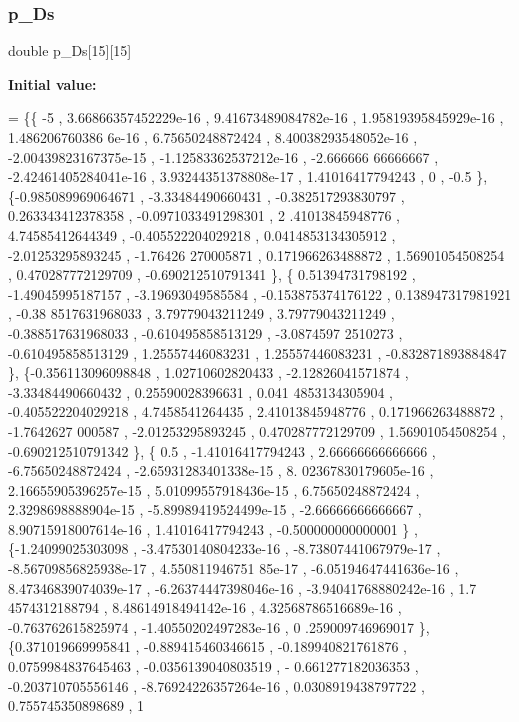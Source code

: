 \subsubsection{\texorpdfstring{p\+\_\+\+Ds}{p\_Ds}}
{\footnotesize\ttfamily double p\+\_\+\+Ds\mbox{[}15\mbox{]}\mbox{[}15\mbox{]}}

{\bfseries Initial value\+:}
\begin{DoxyCode}
= \{\{               -5 , 3.66866357452229e-16 , 9.41673489084782e-16 , 1.95819395845929e-16 , 1.486206760386
      6e-16 ,  6.75650248872424 , 8.40038293548052e-16 , -2.00439823167375e-15 , -1.12583362537212e-16 , -2.666666
      66666667 , -2.42461405284041e-16 , 3.93244351378808e-17 ,  1.41016417794243 ,                 0 ,           
         -0.5 \},
\{-0.985089969064671 , -3.33484490660431 , -0.382517293830797 , 0.263343412378358 , -0.0971033491298301 ,  2
      .41013845948776 ,  4.74585412644349 , -0.405522204029218 , 0.0414853134305912 , -2.01253295893245 , -1.76426
      270005871 , 0.171966263488872 ,  1.56901054508254 , 0.470287772129709 , -0.690212510791341 \},
\{ 0.51394731798192 , -1.49045995187157 , -3.19693049585584 , -0.153875374176122 , 0.138947317981921 , -0.38
      8517631968033 ,  3.79779043211249 ,  3.79779043211249 , -0.388517631968033 , -0.610495858513129 , -3.0874597
      2510273 , -0.610495858513129 ,  1.25557446083231 ,  1.25557446083231 , -0.832871893884847 \},
\{-0.356113096098848 ,  1.02710602820433 , -2.12826041571874 , -3.33484490660432 ,  0.25590028396631 , 0.041
      4853134305904 , -0.405522204029218 ,   4.7458541264435 ,  2.41013845948776 , 0.171966263488872 ,  -1.7642627
      000587 , -2.01253295893245 , 0.470287772129709 ,  1.56901054508254 , -0.690212510791342 \},
\{              0.5 , -1.41016417794243 ,  2.66666666666666 , -6.75650248872424 , -2.65931283401338e-15 , 8.
      02367830179605e-16 , 2.16655905396257e-15 , 5.01099557918436e-15 ,  6.75650248872424 , 2.3298698888904e-15 ,
       -5.89989419524499e-15 , -2.66666666666667 , 8.90715918007614e-16 ,  1.41016417794243 , -0.500000000000001 \}
      ,
\{-1.24099025303098 , -3.47530140804233e-16 , -8.73807441067979e-17 , -8.56709856825938e-17 , 4.550811946751
      85e-17 , -6.05194647441636e-16 , 8.47346839074039e-17 , -6.26374447398046e-16 , -3.94041768880242e-16 ,  1.7
      4574312188794 , 8.48614918494142e-16 , 4.32568786516689e-16 , -0.763762615825974 , -1.40550202497283e-16 , 0
      .259009746969017 \},
\{0.371019669995841 , -0.889415460346615 , -0.189940821761876 , 0.0759984837645463 , -0.0356139040803519 , -
      0.661277182036353 , -0.203710705556146 , -8.76924226357264e-16 , 0.0308919438797722 , 0.755745350898689 ,  1

\end{DoxyCode}
